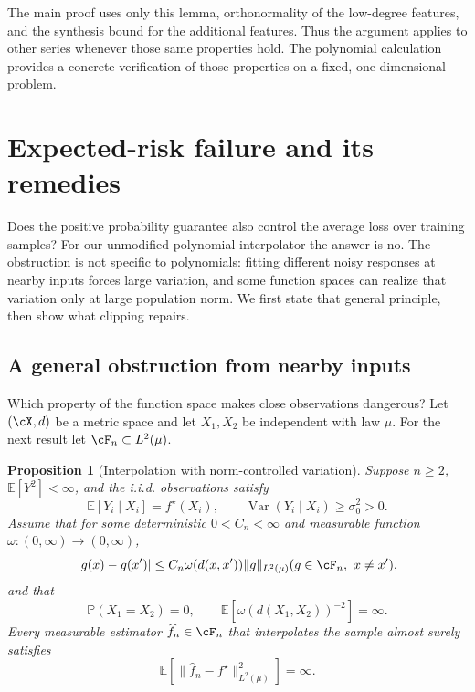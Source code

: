 \documentclass[11pt,twoside]{article}
\newcommand{\E}{\mathbb E}
\renewcommand{\P}{\mathbb P}
\newtheorem{proposition}[theorem]{Proposition}
\theoremstyle{definition}
\theoremstyle{remark}
\begin{document}
The main proof uses only this lemma, orthonormality of the low-degree
features, and the synthesis bound for the additional features. Thus the
argument applies to other series whenever those same properties hold.
The polynomial calculation provides a concrete verification of those
properties on a fixed, one-dimensional problem.

\section{Expected-risk failure and its remedies}
\label{app:expected-risk}

Does the positive probability guarantee also control the average loss over
training samples? For our unmodified polynomial interpolator the answer is
no. The obstruction is not specific to polynomials: fitting different noisy
responses at nearby inputs forces large variation, and some function spaces
can realize that variation only at large population norm. We first state
that general principle, then show what clipping repairs.

\subsection{A general obstruction from nearby inputs}

Which property of the function space makes close observations dangerous?
Let $(\cX,d)$ be a metric space and let $X_1,X_2$ be independent with law
$\mu$. For the next result let $\cF_n\subset L^2(\mu)$.

\begin{proposition}[Interpolation with norm-controlled variation]
\label{prop:infinite-expected-risk}
Suppose $n\ge2$, $\E[Y^2]<\infty$, and the i.i.d. observations satisfy
\[
 \E[Y_i\mid X_i]=f^\star(X_i),\qquad
 \operatorname{Var}(Y_i\mid X_i)\ge\sigma_0^2>0.
\]
Assume that for some deterministic $0<C_n<\infty$ and measurable function
$\omega:(0,\infty)\to(0,\infty)$,
\begin{equation}
 |g(x)-g(x')|
 \le C_n\omega(d(x,x'))\|g\|_{L^2(\mu)}
 \quad(g\in\cF_n,\ x\ne x'),
 \label{eq:variation-control}
\end{equation}
and that
\[
 \P(X_1=X_2)=0,\qquad
 \E\!\left[\omega(d(X_1,X_2))^{-2}\right]=\infty.
\]
Every measurable estimator $\widehat f_n\in\cF_n$ that interpolates the
sample almost surely satisfies
\[
 \E[\|\widehat f_n-f^\star\|_{L^2(\mu)}^2]=\infty.
\]
\end{proposition}
\end{document}
